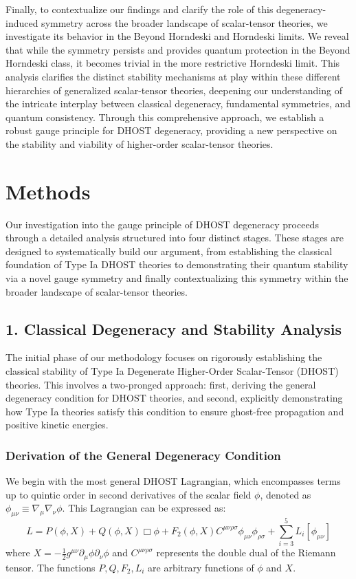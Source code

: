 \documentclass[twocolumn]{aastex631}
\begin{document}
Finally, to contextualize our findings and clarify the role of this degeneracy-induced symmetry across the broader landscape of scalar-tensor theories, we investigate its behavior in the Beyond Horndeski and Horndeski limits. We reveal that while the symmetry persists and provides quantum protection in the Beyond Horndeski class, it becomes trivial in the more restrictive Horndeski limit. This analysis clarifies the distinct stability mechanisms at play within these different hierarchies of generalized scalar-tensor theories, deepening our understanding of the intricate interplay between classical degeneracy, fundamental symmetries, and quantum consistency. Through this comprehensive approach, we establish a robust gauge principle for DHOST degeneracy, providing a new perspective on the stability and viability of higher-order scalar-tensor theories.


\section{Methods}
\label{sec:methods}
\label{sec:methods}
Our investigation into the gauge principle of DHOST degeneracy proceeds through a detailed analysis structured into four distinct stages. These stages are designed to systematically build our argument, from establishing the classical foundation of Type Ia DHOST theories to demonstrating their quantum stability via a novel gauge symmetry and finally contextualizing this symmetry within the broader landscape of scalar-tensor theories.

\subsection*{1. Classical Degeneracy and Stability Analysis}
The initial phase of our methodology focuses on rigorously establishing the classical stability of Type Ia Degenerate Higher-Order Scalar-Tensor (DHOST) theories. This involves a two-pronged approach: first, deriving the general degeneracy condition for DHOST theories, and second, explicitly demonstrating how Type Ia theories satisfy this condition to ensure ghost-free propagation and positive kinetic energies.

\subsubsection*{Derivation of the General Degeneracy Condition}
We begin with the most general DHOST Lagrangian, which encompasses terms up to quintic order in second derivatives of the scalar field $\phi$, denoted as $\phi_{\mu\nu} \equiv \nabla_\mu \nabla_\nu \phi$. This Lagrangian can be expressed as:
$$L = P(\phi,X) + Q(\phi,X) \Box\phi + F_2(\phi,X) C^{\mu\nu\rho\sigma} \phi_{\mu\nu} \phi_{\rho\sigma} + \sum_{i=3}^{5} L_i[\phi_{\mu\nu}]$$
where $X = -\frac{1}{2} g^{\mu\nu} \partial_\mu \phi \partial_\nu \phi$ and $C^{\mu\nu\rho\sigma}$ represents the double dual of the Riemann tensor. The functions $P, Q, F_2, L_i$ are arbitrary functions of $\phi$ and $X$.
\end{document}
